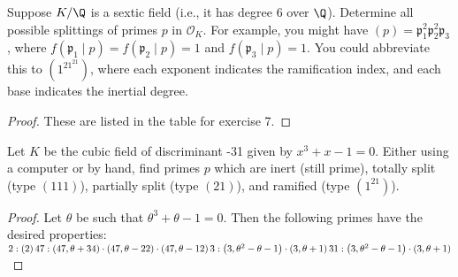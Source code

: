 \documentclass[10pt]{amsart}
\begin{document}
\begin{thm}
  \newcommand{\fp}{\mathfrak{p}}
  Suppose $K/\Q$ is a sextic field (i.e., it has degree 6 over $\Q$). Determine all possible splittings of primes $p$ in $\mathcal{O}_K$.
  For example, you might have $(p) = \fp_1^2\fp_2^2\fp_3$, where $f(\fp_1 \mid p) = f(\fp_2 \mid p) = 1$ and $f(\fp_3 \mid p) = 1$. 
  You could abbreviate this to $(1^21^21)$, where each exponent indicates the ramification index, and each base indicates the inertial degree.
  \begin{proof}
    These are listed in the table for exercise 7.
  \end{proof}
\end{thm}

\begin{thm}
  Let $K$ be the cubic field of discriminant -31 given by $x^3 + x - 1 = 0$. 
  Either using a computer or by hand, find primes $p$ which are inert (still prime), totally split (type $(111)$), partially split (type $(21)$), and ramified (type $(1^21)$).
  \begin{proof}
    Let $\theta$ be such that $\theta^3 + \theta - 1 = 0$.
    Then the following primes have the desired properties:\\
    $2 : \left(2\right) \\
    47 : \left(47, \theta + 34\right) \cdot \left(47, \theta - 22\right) \cdot \left(47, \theta - 12\right)\\
    3 : \left(3, \theta^{2} - \theta - 1\right) \cdot \left(3, \theta + 1\right)\\
    31 : \left(3, \theta^{2} - \theta - 1\right) \cdot \left(3, \theta + 1\right)$
  \end{proof}
\end{thm}
\end{document}
